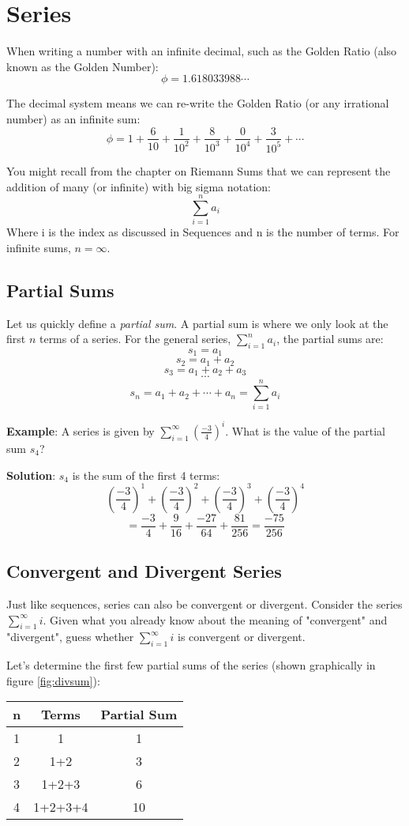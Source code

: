\chapter{Series}
When writing a number with an infinite decimal, such as the Golden 
Ratio (also known as the Golden Number):
$$\phi = 1.618033988 \cdots$$

The decimal system means we can re-write the Golden Ratio (or any 
irrational number) as an infinite sum:
$$\phi = 1 + \frac{6}{10} + \frac{1}{10^2} + \frac{8}{10^3} + 
\frac{0}{10^4} + \frac{3}{10^5} + \cdots$$

You might recall from the chapter on Riemann Sums that we can 
represent the addition of many (or infinite) with big sigma notation:
$$\sum_{i = 1}^n a_i$$
Where i is the index as discussed in Sequences and n is the number of 
terms. For infinite sums, $n = \infty$.

\section{Partial Sums}
Let us quickly define a \textit{partial sum}. A partial sum is where 
we only look at the first $n$ terms of a series. For the general 
series, $\sum_{i=1}^{n} a_i$, the partial sums are:
$$s_1 = a_1$$
$$s_2 = a_1 + a_2$$
$$s_3 = a_1 + a_2 + a_3$$
$$\cdots$$
$$s_n = a_1 + a_2 + \cdots + a_n = \sum_{i=1}^{n} a_i$$

\textbf{Example}: A series is given by $\sum_{i=1}^\infty 
(\frac{-3}{4})^i$. What is the value of the partial sum $s_4$?

\textbf{Solution}: $s_4$ is the sum of the first 4 terms: 
$$(\frac{-3}{4})^1 + (\frac{-3}{4})^2 + (\frac{-3}{4})^3 + (\frac{-3}{4})^4$$
$$= \frac{-3}{4} + \frac{9}{16} + \frac{-27}{64} + \frac{81}{256} = \frac{-75}{256}$$


\section{Convergent and Divergent Series}
Just like sequences, series can also be convergent or divergent. 
Consider the series $\sum_{i=1}^\infty i$. Given what you already 
know about the meaning of "convergent" and "divergent", guess whether 
$\sum_{i=1}^\infty i$ is convergent or divergent. 

Let's determine the first few partial sums of the series (shown 
graphically in figure \ref{fig:divsum}):
\begin{center}
\begin{tabular}{|c|c|c|}\hline
n & Terms & Partial Sum\\
\hline
1 & 1 & 1\\
\hline
2 & 1+2 & 3\\
\hline
3 & 1+2+3 & 6\\
\hline
4 & 1+2+3+4 & 10\\
\hline
\end{tabular}
\end{center}

